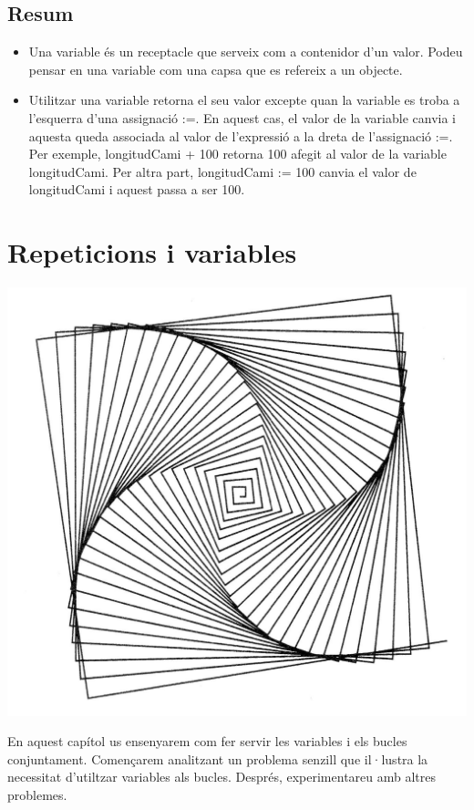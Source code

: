 \section{Resum}

\begin{itemize}
\item Una variable és un receptacle que serveix com a contenidor d'un valor. Podeu pensar en una variable com una capsa que es refereix a un objecte.
\item Utilitzar una variable retorna el seu valor excepte quan la variable es troba a l'esquerra d'una assignació \textsf{:=}. En aquest cas, el valor de la variable canvia i aquesta queda associada al valor de l'expressió a la dreta de l'assignació \textsf{:=}. Per exemple,  \textsf{longitudCami + 100} retorna  \textsf{100} afegit al valor de la variable \textsf{longitudCami}. Per altra part,  \textsf{longitudCami := 100} canvia el valor de  \textsf{longitudCami} i aquest passa a ser  \textsf{100}.
\end{itemize}


\chapter{Repeticions i variables}
\label{cap10}

\includegraphics[scale=0.2]{Imatges/figura10-0.jpg}

En aquest capítol us ensenyarem com fer servir les variables i els bucles conjuntament. Començarem analitzant un problema senzill que il·lustra la necessitat d'utiltzar variables als bucles. Després, experimentareu amb altres problemes.

